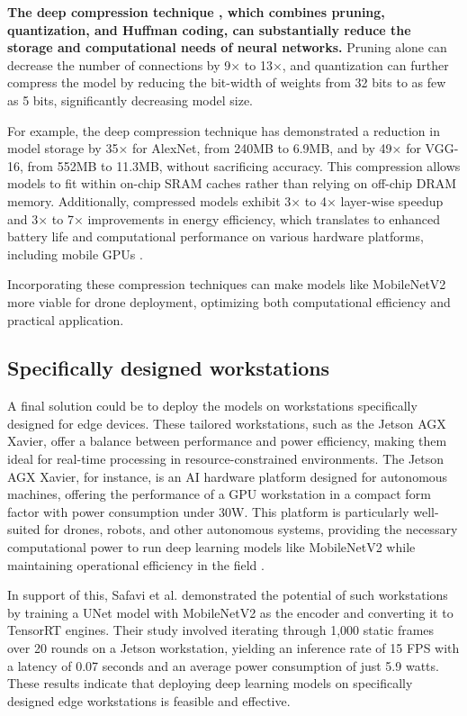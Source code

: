 \documentclass[a4paper]{article}
\begin{document}
\textbf{The deep compression technique \cite{han2016}, which combines pruning, quantization, and Huffman coding, can substantially reduce the storage and computational needs of neural networks.} Pruning alone can decrease the number of connections by 9× to 13×, and quantization can further compress the model by reducing the bit-width of weights from 32 bits to as few as 5 bits, significantly decreasing model size.

For example, the deep compression technique has demonstrated a reduction in model storage by 35× for AlexNet, from 240MB to 6.9MB, and by 49× for VGG-16, from 552MB to 11.3MB, without sacrificing accuracy. This compression allows models to fit within on-chip SRAM caches rather than relying on off-chip DRAM memory. Additionally, compressed models exhibit 3× to 4× layer-wise speedup and 3× to 7× improvements in energy efficiency, which translates to enhanced battery life and computational performance on various hardware platforms, including mobile GPUs \cite{han2016}.

Incorporating these compression techniques can make models like MobileNetV2 more viable for drone deployment, optimizing both computational efficiency and practical application.

\subsection{Specifically designed workstations}

A final solution could be to deploy the models on workstations specifically designed for edge devices. These tailored workstations, such as the Jetson AGX Xavier, offer a balance between performance and power efficiency, making them ideal for real-time processing in resource-constrained environments. The Jetson AGX Xavier, for instance, is an AI hardware platform designed for autonomous machines, offering the performance of a GPU workstation in a compact form factor with power consumption under 30W. This platform is particularly well-suited for drones, robots, and other autonomous systems, providing the necessary computational power to run deep learning models like MobileNetV2 while maintaining operational efficiency in the field \cite{tran2022}.

In support of this, Safavi et al. \cite{safavi2023efficientsemanticsegmentationedge} demonstrated the potential of such workstations by training a UNet model with MobileNetV2 as the encoder and converting it to TensorRT engines. Their study involved iterating through 1,000 static frames over 20 rounds on a Jetson workstation, yielding an inference rate of 15 FPS with a latency of 0.07 seconds and an average power consumption of just 5.9 watts. These results indicate that deploying deep learning models on specifically designed edge workstations is feasible and effective.
\end{document}
